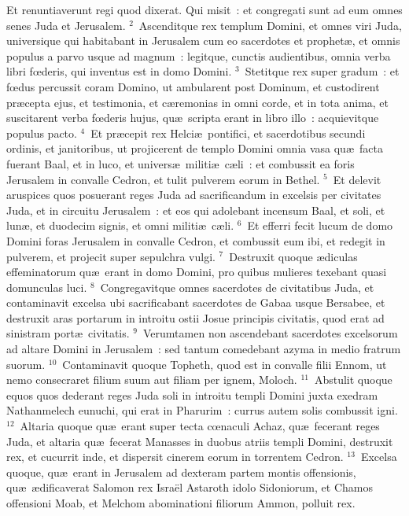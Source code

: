 \lettrine[lines=10,image=true,loversize=0.05,lraise=-0.03]{E}{}t renuntiaverunt regi quod dixerat. Qui misit~: et congregati sunt ad eum omnes senes Juda et Jerusalem.
${}^{2}$~Ascenditque rex templum Domini, et omnes viri Juda, universique qui habitabant in Jerusalem cum eo sacerdotes et prophet\ae , et omnis populus a parvo usque ad magnum~: legitque, cunctis audientibus, omnia verba libri fœderis, qui inventus est in domo Domini.
${}^{3}$~Stetitque rex super gradum~: et fœdus percussit coram Domino, ut ambularent post Dominum, et custodirent pr\ae cepta ejus, et testimonia, et c\ae remonias in omni corde, et in tota anima, et suscitarent verba fœderis hujus, qu\ae\ scripta erant in libro illo~: acquievitque populus pacto.
${}^{4}$~Et pr\ae cepit rex Helci\ae\ pontifici, et sacerdotibus secundi ordinis, et janitoribus, ut projicerent de templo Domini omnia vasa qu\ae\ facta fuerant Baal, et in luco, et univers\ae\ militi\ae\ c\ae li~: et combussit ea foris Jerusalem in convalle Cedron, et tulit pulverem eorum in Bethel.
${}^{5}$~Et delevit aruspices quos posuerant reges Juda ad sacrificandum in excelsis per civitates Juda, et in circuitu Jerusalem~: et eos qui adolebant incensum Baal, et soli, et lun\ae , et duodecim signis, et omni militi\ae\ c\ae li.
${}^{6}$~Et efferri fecit lucum de domo Domini foras Jerusalem in convalle Cedron, et combussit eum ibi, et redegit in pulverem, et projecit super sepulchra vulgi.
${}^{7}$~Destruxit quoque \ae diculas effeminatorum qu\ae\ erant in domo Domini, pro quibus mulieres texebant quasi domunculas luci.
${}^{8}$~Congregavitque omnes sacerdotes de civitatibus Juda, et contaminavit excelsa ubi sacrificabant sacerdotes de Gabaa usque Bersabee, et destruxit aras portarum in introitu ostii Josue principis civitatis, quod erat ad sinistram port\ae\ civitatis.
${}^{9}$~Verumtamen non ascendebant sacerdotes excelsorum ad altare Domini in Jerusalem~: sed tantum comedebant azyma in medio fratrum suorum.
${}^{10}$~Contaminavit quoque Topheth, quod est in convalle filii Ennom, ut nemo consecraret filium suum aut filiam per ignem, Moloch.
${}^{11}$~Abstulit quoque equos quos dederant reges Juda soli in introitu templi Domini juxta exedram Nathanmelech eunuchi, qui erat in Pharurim~: currus autem solis combussit igni.
${}^{12}$~Altaria quoque qu\ae\ erant super tecta cœnaculi Achaz, qu\ae\ fecerant reges Juda, et altaria qu\ae\ fecerat Manasses in duobus atriis templi Domini, destruxit rex, et cucurrit inde, et dispersit cinerem eorum in torrentem Cedron.
${}^{13}$~Excelsa quoque, qu\ae\ erant in Jerusalem ad dexteram partem montis offensionis, qu\ae\ \ae dificaverat Salomon rex Isra\"el Astaroth idolo Sidoniorum, et Chamos offensioni Moab, et Melchom abominationi filiorum Ammon, polluit rex.
